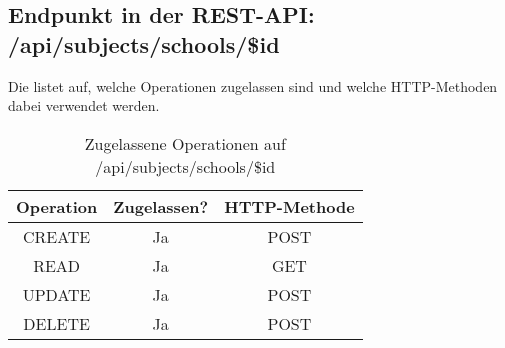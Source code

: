 \subsection{Endpunkt in der REST-API: /api/subjects/schools/\$id}
Die  listet auf, welche Operationen zugelassen sind und welche HTTP-Methoden dabei verwendet werden. 

\begin{table}[!htbp]
	\begin{tabular}{|c|c|c|}
		\hline
			\textbf{Operation} & \textbf{Zugelassen?} & \textbf{HTTP-Methode} \\ \hline
			CREATE & Ja & POST \\ \hline 
			READ & Ja & GET \\ \hline
			UPDATE & Ja & POST \\ \hline 
			DELETE & Ja & POST \\ \hline
	\end{tabular}

		\caption{Zugelassene Operationen auf /api/subjects/schools/\$id}
		\label{tab:end:rest:api:subjects:schools:id:meth}
\end{table}